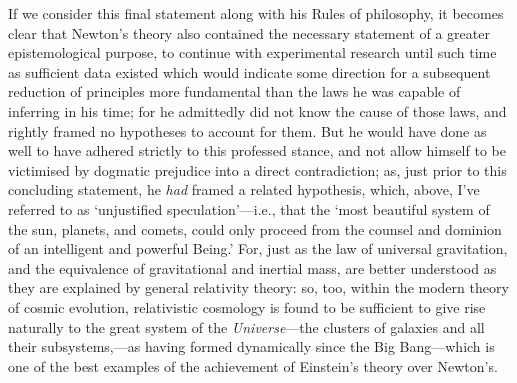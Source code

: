 If we consider this final statement along with his Rules of philosophy, it becomes clear that Newton's theory also contained the necessary statement of a greater epistemological purpose, to continue with experimental research until such time as sufficient data existed which would indicate some direction for a subsequent reduction of principles more fundamental than the laws he was capable of inferring in his time; for he admittedly did not know the cause of those laws, and rightly framed no hypotheses to account for them. But he would have done as well to have adhered strictly to this professed stance, and not allow himself to be victimised by dogmatic prejudice into a direct contradiction; as, just prior to this concluding statement, he \textit{had} framed a related hypothesis, which, above, I've referred to as `unjustified speculation'---i.e., that the `most beautiful system of the sun, planets, and comets, could only proceed from the counsel and dominion of an intelligent and powerful Being.' For, just as the law of universal gravitation, and the equivalence of gravitational and inertial mass, are better understood as they are explained by general relativity theory: so, too, within the modern theory of cosmic evolution, relativistic cosmology is found to be sufficient to give rise naturally to the great system of the \textit{Universe}---the clusters of galaxies and all their subsystems,---as having formed dynamically since the Big Bang---which is one of the best examples of the achievement of Einstein's theory over Newton's.

